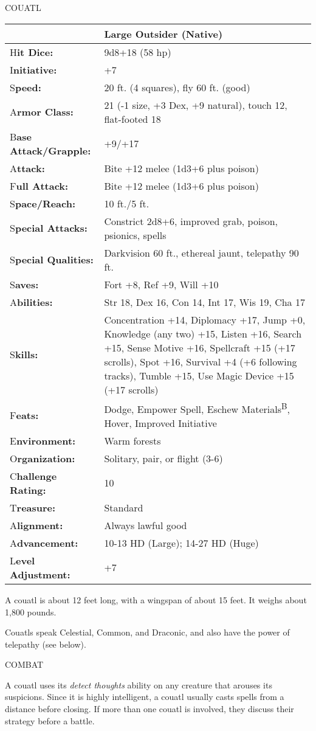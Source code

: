 \documentclass{article}
\begin{document}
\vspace{12pt}
{\LARGE{}COUATL}

\begin{tabular}{|>{\raggedright}p{91pt}|>{\raggedright}p{231pt}|}
\hline
  & Large Outsider (Native)\tabularnewline
\hline
H\textbf{it Dice:} & 9d8+18 (58 hp)\tabularnewline
\hline
I\textbf{nitiative:} & +7\tabularnewline
\hline
S\textbf{peed:} & 20 ft. (4 squares), fly 60 ft. (good)\tabularnewline
\hline
A\textbf{rmor Class:} & 21 (-1 size, +3 Dex, +9 natural), touch 12, flat-footed 
18\tabularnewline
\hline
B\textbf{ase Attack/Grapple:} & +9/+17\tabularnewline
\hline
A\textbf{ttack:} & Bite +12 melee (1d3+6 plus poison)\tabularnewline
\hline
F\textbf{ull Attack:} & Bite +12 melee (1d3+6 plus poison)\tabularnewline
\hline
S\textbf{pace/Reach:} & 10 ft./5 ft.\tabularnewline
\hline
S\textbf{pecial Attacks:} & Constrict 2d8+6, improved grab, poison, psionics, spells\tabularnewline
\hline
S\textbf{pecial Qualities:} & Darkvision 60 ft., ethereal jaunt, telepathy 90 ft.\tabularnewline
\hline
S\textbf{aves:} & Fort +8, Ref +9, Will +10\tabularnewline
\hline
A\textbf{bilities:} & Str 18, Dex 16, Con 14, Int 17, Wis 19, Cha 17\tabularnewline
\hline
S\textbf{kills:} & Concentration +14, Diplomacy +17, Jump +0, Knowledge (any two) 
+15, Listen +16, Search +15, Sense Motive +16, Spellcraft +15 (+17 scrolls), Spot 
+16, Survival +4 (+6 following tracks), Tumble +15, Use Magic Device +15 (+17 scrolls)\tabularnewline
\hline
F\textbf{eats:} & Dodge, Empower Spell, Eschew Materials\textsuperscript{B}, Hover, 
Improved Initiative\tabularnewline
\hline
E\textbf{nvironment:} & Warm forests\tabularnewline
\hline
O\textbf{rganization:} & Solitary, pair, or flight (3-6)\tabularnewline
\hline
C\textbf{hallenge Rating:} & 10\tabularnewline
\hline
T\textbf{reasure:} & Standard\tabularnewline
\hline
A\textbf{lignment:} & Always lawful good\tabularnewline
\hline
A\textbf{dvancement:} & 10-13 HD (Large); 14-27 HD (Huge)\tabularnewline
\hline
L\textbf{evel Adjustment:} & +7\tabularnewline
\hline
\end{tabular}

A couatl is about 12 feet long, with a wingspan of about 15 feet. It weighs about 
1,800 pounds.

Couatls speak Celestial, Common, and Draconic, and also have the power of telepathy 
(see below).

COMBAT

A couatl uses its \textit{detect thoughts }ability on any creature that arouses 
its suspicions. Since it is highly intelligent, a couatl usually casts spells from 
a distance before closing. If more than one couatl is involved, they discuss their 
strategy before a battle.
\end{document}
